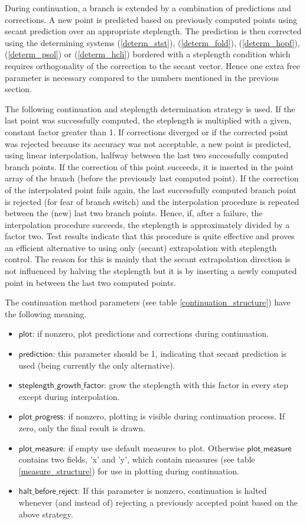 \documentclass[10pt]{article}
\gdef \parm#1{{\mathsf{#1}}}
\begin{document}
{During continuation, a branch is extended by a combination
of predictions and corrections.
A new point is predicted based on previously computed points
using
secant prediction 
over an appropriate steplength. The prediction is then corrected
using the
determining systems (\ref{determ_stst}), (\ref{determ_fold}), 
(\ref{determ_hopf}), (\ref{determ_psol}) or   
(\ref{determ_hcli}) bordered with a steplength condition
which requires orthogonality 
of the correction to the secant vector.
Hence one extra free parameter is necessary compared to the 
numbers mentioned in the previous section.
 
The following continuation and steplength determination 
strategy is used.
If the last point was successfully computed, the steplength
is multiplied with a given, constant factor greater than 1.
If corrections diverged or if the corrected point was rejected
because its accuracy was not acceptable,
a new point is predicted, using linear interpolation, halfway between the
last two successfully computed branch points.
If the correction of this point succeeds, 
it is inserted in the point array of the branch (before the
previously last computed point). 
If the correction of the interpolated point fails again, 
the last successfully computed branch point is rejected (for fear
of branch switch) and the interpolation procedure 
is repeated between the (new) last two
branch points. Hence, if, after a failure, the interpolation 
procedure succeeds, the steplength is approximately divided by 
a factor two. Test results indicate that this procedure is quite
effective and proves an efficient alternative to 
using only (secant) extrapolation with steplength control.
The reason for this is mainly that
the secant extrapolation direction is not influenced by halving
the steplength but it is by inserting a newly computed point in between
the last two computed points.

The continuation method parameters (see table \ref{continuation_structure})
have the following meaning.
\begin{itemize}
\item $\parm{plot}$: if nonzero, plot predictions and corrections
during continuation.
\item $\parm{prediction}$: this parameter should be 1, indicating
that secant prediction is used (being currently the only
alternative).
\item $\parm{steplength\_growth\_factor}$: grow the steplength with
this factor in every step except during interpolation.
\item $\parm{plot\_progress}$: if nonzero, plotting is visible during
continuation process. If zero, only the final result is drawn.
\item $\parm{plot\_measure}$: if empty use default measures to plot.
Otherwise $\parm{plot\_measure}$ contains two fields, 'x' and 'y',
which contain measures (see table \ref{measure_structure}) for use in plotting during
continuation.
\item $\parm{halt\_before\_reject}$: If this parameter is nonzero,
continuation is halted whenever (and instead of) rejecting a
previously accepted point based on the above strategy.
\end{itemize}

}
\end{document}
